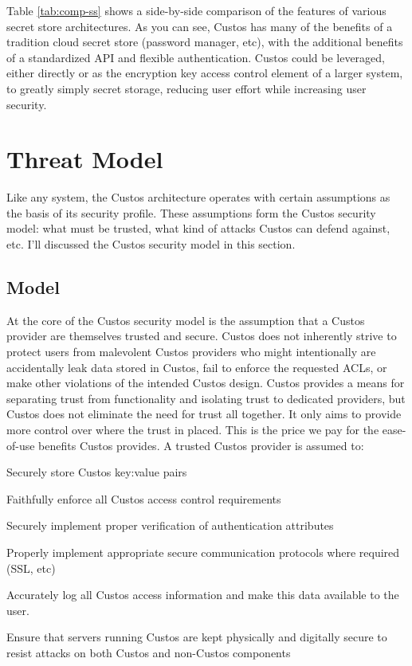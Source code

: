 Table \ref{tab:comp-ss} shows a side-by-side comparison of the
features of various secret store architectures. As you can see, Custos
has many of the benefits of a tradition cloud secret store (password
manager, etc), with the additional benefits of a standardized API and
flexible authentication. Custos could be leveraged, either directly or
as the encryption key access control element of a larger system, to
greatly simply secret storage, reducing user effort while increasing
user security.

\section{Threat Model}

Like any system, the Custos architecture operates with certain
assumptions as the basis of its security profile. These assumptions
form the Custos security model: what must be trusted, what kind of
attacks Custos can defend against, etc. I'll discussed the Custos
security model in this section.

\subsection{Model}

At the core of the Custos security model is the assumption that a
Custos provider are themselves trusted and secure. Custos does not
inherently strive to protect users from malevolent Custos providers
who might intentionally are accidentally leak data stored in Custos, fail
to enforce the requested ACLs, or make other violations of the intended
Custos design. Custos provides a means for separating trust from
functionality and isolating trust to dedicated providers, but Custos
does not eliminate the need for trust all together. It only aims to
provide more control over where the trust in placed. This is the price
we pay for the ease-of-use benefits Custos provides. A trusted Custos
provider is assumed to:

\begin{packed_item}
\item Securely store Custos key:value pairs
\item Faithfully enforce all Custos access control requirements
\item Securely implement proper verification of authentication attributes
\item Properly implement appropriate secure communication protocols where
  required (SSL, etc)
\item Accurately log all Custos access information and make this data
  available to the user.
\item Ensure that servers running Custos are kept physically and
  digitally secure to resist attacks on both Custos and non-Custos
  components
\end{packed_item}

